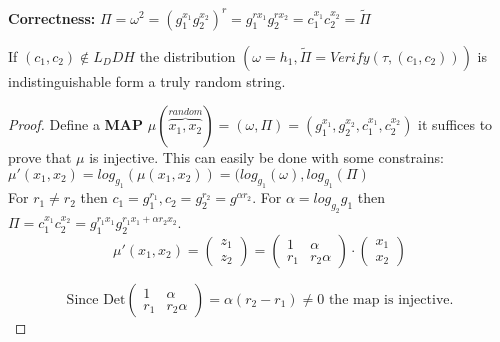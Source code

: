 \textbf{Correctness:} $\Pi=\omega^2=(g_1^{x_1}g_2^{x_2})^r=g_1^{rx_1}g_2^{rx_2}=c_1^{x_1}c_2^{x_2}=\widetilde{\Pi}$

\begin{theorem}
    If $(c_1,c_2)\notin L_DDH$ the distribution $(\omega=h_1, \widetilde{\Pi}=Verify(\tau,(c_1,c_2)))$ is indistinguishable form a truly random string.
\end{theorem}

\begin{proof}
    Define a \textbf{MAP} $\mu(\overbrace{x_1,x_2}^{random})=(\omega,\Pi)=(g_1^{x_1},g_2^{x_2},c_1^{x_1},c_2^{x_2})$ it suffices to prove that $\mu$ is injective. This can easily be done with some constrains:
    $\mu'(x_1,x_2)=log_{g_1}(\mu(x_1,x_2))=(log_{g_1}(\omega),log_{g_1}(\Pi)$\\
    For $r_1\neq r_2$ then $c_1=g_1^{r_1},c_2=g_2^{r_2}=g^{\alpha r_2}$. For $\alpha=log_{g_2}g_1$ then $\Pi=c_1^{x_1}c_2^{x_2}=g_1^{r_1x_1}g_2^{r_1x_1+\alpha r_2x_2}$.\\
    \[\mu'(x_1,x_2)=
        \begin{pmatrix}
            z_1\\
            z_2
        \end{pmatrix}
        =
        \begin{pmatrix}
            1 & \alpha \\
            r_1 & r_2\alpha 
        \end{pmatrix}
        \cdot
        \begin{pmatrix}
            x_1\\
            x_2
        \end{pmatrix}
    \]

    \[ \text{Since Det}
    \begin{pmatrix}
        1 & \alpha \\
        r_1 & r_2\alpha 
    \end{pmatrix}=
    \alpha(r_2-r_1)\neq 0
    \text{ the map is injective.}
    \] 
\end{proof}